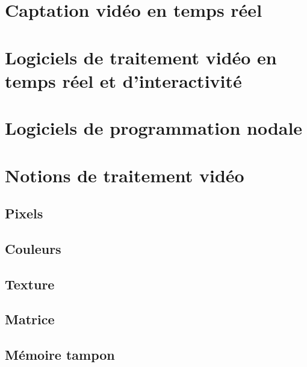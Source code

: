 \documentclass[
]{book}
\begin{document}
\hypertarget{captation-viduxe9o-en-temps-ruxe9el}{%
\section{Captation vidéo en temps réel}\label{captation-viduxe9o-en-temps-ruxe9el}}

\hypertarget{logiciels-de-traitement-viduxe9o-en-temps-ruxe9el-et-dinteractivituxe9}{%
\section{Logiciels de traitement vidéo en temps réel et d'interactivité}\label{logiciels-de-traitement-viduxe9o-en-temps-ruxe9el-et-dinteractivituxe9}}

\hypertarget{logiciels-de-programmation-nodale}{%
\section{Logiciels de programmation nodale}\label{logiciels-de-programmation-nodale}}

\hypertarget{notions-de-traitement-viduxe9o}{%
\section{Notions de traitement vidéo}\label{notions-de-traitement-viduxe9o}}

\hypertarget{pixels}{%
\subsection{Pixels}\label{pixels}}

\hypertarget{couleurs}{%
\subsection{Couleurs}\label{couleurs}}

\hypertarget{texture}{%
\subsection{Texture}\label{texture}}

\hypertarget{matrice}{%
\subsection{Matrice}\label{matrice}}

\hypertarget{muxe9moire-tampon}{%
\subsection{Mémoire tampon}\label{muxe9moire-tampon}}
\end{document}
